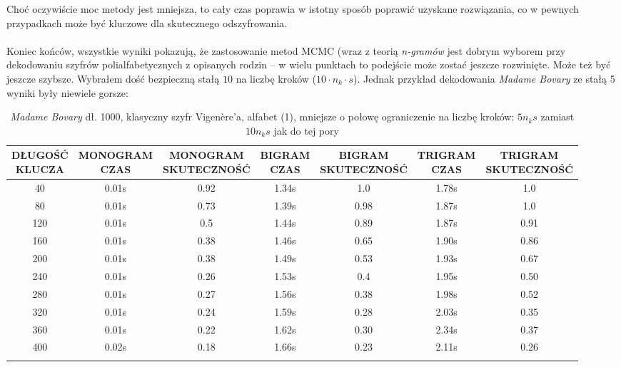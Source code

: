 \documentclass[a4paper]{article}
\theoremstyle{defn}
\theoremstyle{theorem}
\theoremstyle{lemma}
\theoremstyle{cor}
\theoremstyle{fact}
\begin{document}
Choć oczywiście moc metody jest mniejsza, to cały czas poprawia w istotny sposób poprawić uzyskane rozwiązania, co w pewnych przypadkach może być kluczowe dla skutecznego odszyfrowania.\\\\
Koniec końców, wszystkie wyniki pokazują, że zastosowanie metod MCMC (wraz z teorią \textit{n-gramów} jest dobrym wyborem przy dekodowaniu szyfrów polialfabetycznych z opisanych rodzin – w wielu punktach to podejście może zostać jeszcze rozwinięte. Może też być jeszcze szybsze. Wybrałem dość bezpieczną stałą $10$ na liczbę kroków ($10 \cdot n_k \cdot s$). Jednak przykład dekodowania \textit{Madame Bovary} ze stałą 5 wyniki były niewiele gorsze:
\begin{center}\begin{small}\begin{longtable}{|c|c|c|c|c|c|c|}
\hline \makecell{DŁUGOŚĆ\\KLUCZA} &  \makecell{MONOGRAM\\CZAS} & \makecell{MONOGRAM\\SKUTECZNOŚĆ} & \makecell{BIGRAM\\CZAS} &  \makecell{BIGRAM\\SKUTECZNOŚĆ} & \makecell{TRIGRAM\\CZAS} & \makecell{TRIGRAM\\SKUTECZNOŚĆ}\\ \hline
40 & 0.01s & 0.92 & 1.34s & 1.0 & 1.78s & 1.0 \\ \hline
80 & 0.01s & 0.73 & 1.39s & 0.98 & 1.87s & 1.0 \\ \hline
120 & 0.01s & 0.5 & 1.44s & 0.89 & 1.87s & 0.91 \\ \hline
160 & 0.01s & 0.38 & 1.46s & 0.65 & 1.90s & 0.86 \\ \hline
200 & 0.01s & 0.38 & 1.49s & 0.53 & 1.93s & 0.67 \\ \hline
240 & 0.01s & 0.26 & 1.53s & 0.4 & 1.95s & 0.50 \\ \hline
280 & 0.01s & 0.27 & 1.56s & 0.38 & 1.98s & 0.52 \\ \hline
320 & 0.01s & 0.24 & 1.59s & 0.28 & 2.03s & 0.35 \\ \hline
360 & 0.01s & 0.22 & 1.62s & 0.30 & 2.34s & 0.37 \\ \hline
400 & 0.02s & 0.18 & 1.66s & 0.23 & 2.11s & 0.26 \\ \hline
\caption{\textit{Madame Bovary} dł. 1000, klasyczny szyfr Vigenère'a, alfabet (1), mniejsze o połowę ograniczenie na liczbę kroków: $5n_k s$ zamiast $10 n_k s$ jak do tej pory}
\end{longtable}\end{small}\end{center}
\end{document}
